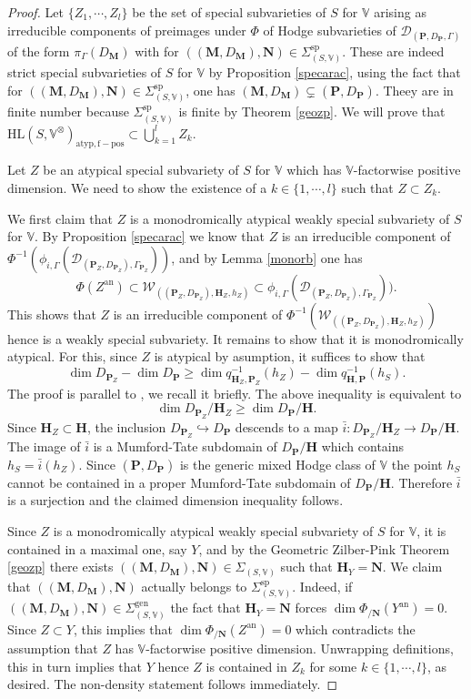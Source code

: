 \documentclass[10pt]{article}
\numberwithin{equation}{subsection}
\theoremstyle{plain}
\theoremstyle{definition}
\theoremstyle{remark}
\newcommand{\V}{\mathbb V}
\newcommand{\pp}{\mathbf P}
\newcommand{\mon}{\mathbf H}
\newcommand{\M}{\mathbf M}
\newcommand{\NN}{\mathbf N}
\newcommand{\HL}{\mathrm{HL}(S, \V^\otimes)}
\newcommand{\an}{\mathrm{an}}
\newcommand{\period}{\mathscr{D}}
\begin{document}
\begin{proof}
Let $\{Z_1, \cdots, Z_l\}$ be the set of special subvarieties of $S$ for $\V$ arising as irreducible components of preimages under $\Phi$ of Hodge subvarieties of $\period_{(\pp, D_\pp, \Gamma)}$ of the form $\pi_\Gamma(D_\M)$ with for $((\M, D_\M), \NN)\in \Sigma_{(S, \V)}^\mathrm{sp}$. These are indeed strict special subvarieties of $S$ for $\V$ by Proposition \ref{specarac}, using the fact that for $((\M, D_\M), \NN)\in \Sigma_{(S, \V)}^\mathrm{sp}$, one has $(\M, D_\M) \subsetneq (\pp, D_\pp)$. Theey are in finite number because $\Sigma_{(S, \V)}^\mathrm{sp}$ is finite by Theorem \ref{geozp}. We will prove that $\HL_{\mathrm{atyp}, \mathrm{f-pos}} \subset \bigcup_{k = 1}^l Z_k.$

Let $Z$ be an atypical special subvariety of $S$ for $\V$ which has $\V$-factorwise positive dimension. We need to show the existence of a $k \in \{1, \cdots, l\}$ such that $Z \subset Z_k$.

We first claim that $Z$ is a monodromically atypical weakly special subvariety of $S$ for $\V$. By Proposition \ref{specarac} we know that $Z$ is an irreducible component of $\Phi^{-1}(\phi_{i, \Gamma}(\period_{(\pp_Z, D_{\pp_Z}), \Gamma_{\pp_Z}}))$, and by Lemma \ref{monorb} one has
\[
\Phi(Z^\an) \subset \mathscr{W}_{((\pp_Z, D_{\pp_Z}), \mon_Z, h_Z)} \subset \phi_{i, \Gamma}(\period_{(\pp_Z, D_{\pp_Z}), \Gamma_{\pp_Z}})).
\]
This shows that $Z$ is an irreducible component of $\Phi^{-1}( \mathscr{W}_{((\pp_Z, D_{\pp_Z}), \mon_Z, h_Z)})$ hence is a weakly special subvariety. It remains to show that it is monodromically atypical. For this, since $Z$ is atypical by asumption, it suffices to show that
\[
\dim D_{\pp_Z} - \dim D_\pp \geqslant \dim q_{\mon_Z, \pp_Z}^{-1}(h_Z) - \dim q_{\mon, \pp}^{-1}(h_S).
\]
The proof is parallel to \cite[Lem. 5.6]{bku}, we recall it briefly. The above inequality is equivalent to
\[
\dim D_{\pp_Z}/\mon_Z \geqslant \dim D_\pp/\mon.
\]
Since $\mon_Z \subset \mon$, the inclusion $D_{\pp_Z} \hookrightarrow D_\pp$ descends to a map $\bar{i} : D_{\pp_Z}/\mon_Z \rightarrow D_\pp/\mon$. The image of $\bar{i}$ is a Mumford-Tate subdomain of $D_\pp/\mon$ which contains $h_S = \bar{i}(h_Z)$. Since $(\pp, D_\pp)$ is the generic mixed Hodge class of $\V$ the point $h_S$ cannot be contained in a proper Mumford-Tate subdomain of $D_\pp/\mon$. Therefore $\bar{i}$ is a surjection and the claimed dimension inequality follows.

Since $Z$ is a monodromically atypical weakly special subvariety of $S$ for $\V$, it is contained in a maximal one, say $Y$, and by the Geometric Zilber-Pink Theorem \ref{geozp} there exists $((\M, D_\M), \NN) \in \Sigma_{(S, \V)}$ such that $\mon_Y = \NN$. We claim that $((\M, D_\M), \NN)$ actually belongs to $\Sigma_{(S, \V)}^\mathrm{sp}$. Indeed, if $((\M, D_\M), \NN) \in \Sigma_{(S, \V)}^\mathrm{gen}$ the fact that $\mon_Y = \NN$ forces $\dim \Phi_{/\NN}(Y^\an) = 0.$ Since $Z \subset Y$, this implies that $\dim \Phi_{/\NN}(Z^\an) = 0$ which contradicts the assumption that $Z$ has $\V$-factorwise positive dimension. Unwrapping definitions, this in turn implies that $Y$ hence $Z$ is contained in $Z_k$ for some $k \in \{1, \cdots, l\}$, as desired. The non-density statement follows immediately.
\end{proof}
\end{document}

